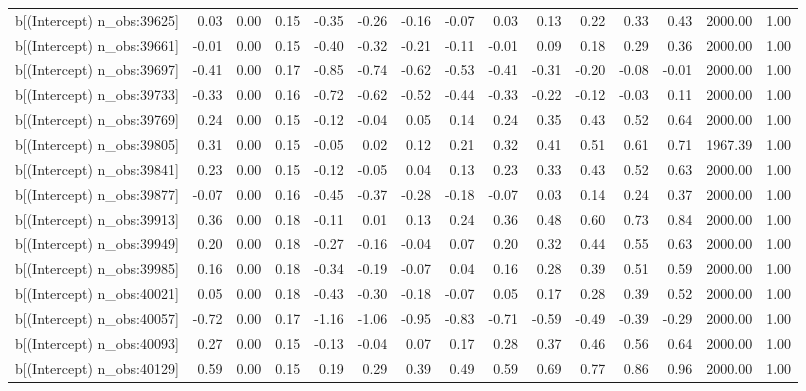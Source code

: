 \begin{table}[ht]
\begin{tabular}{rrrrrrrrrrrrrrr}
  b[(Intercept) n\_obs:39625] & 0.03 & 0.00 & 0.15 & -0.35 & -0.26 & -0.16 & -0.07 & 0.03 & 0.13 & 0.22 & 0.33 & 0.43 & 2000.00 & 1.00 \\ 
  b[(Intercept) n\_obs:39661] & -0.01 & 0.00 & 0.15 & -0.40 & -0.32 & -0.21 & -0.11 & -0.01 & 0.09 & 0.18 & 0.29 & 0.36 & 2000.00 & 1.00 \\ 
  b[(Intercept) n\_obs:39697] & -0.41 & 0.00 & 0.17 & -0.85 & -0.74 & -0.62 & -0.53 & -0.41 & -0.31 & -0.20 & -0.08 & -0.01 & 2000.00 & 1.00 \\ 
  b[(Intercept) n\_obs:39733] & -0.33 & 0.00 & 0.16 & -0.72 & -0.62 & -0.52 & -0.44 & -0.33 & -0.22 & -0.12 & -0.03 & 0.11 & 2000.00 & 1.00 \\ 
  b[(Intercept) n\_obs:39769] & 0.24 & 0.00 & 0.15 & -0.12 & -0.04 & 0.05 & 0.14 & 0.24 & 0.35 & 0.43 & 0.52 & 0.64 & 2000.00 & 1.00 \\ 
  b[(Intercept) n\_obs:39805] & 0.31 & 0.00 & 0.15 & -0.05 & 0.02 & 0.12 & 0.21 & 0.32 & 0.41 & 0.51 & 0.61 & 0.71 & 1967.39 & 1.00 \\ 
  b[(Intercept) n\_obs:39841] & 0.23 & 0.00 & 0.15 & -0.12 & -0.05 & 0.04 & 0.13 & 0.23 & 0.33 & 0.43 & 0.52 & 0.63 & 2000.00 & 1.00 \\ 
  b[(Intercept) n\_obs:39877] & -0.07 & 0.00 & 0.16 & -0.45 & -0.37 & -0.28 & -0.18 & -0.07 & 0.03 & 0.14 & 0.24 & 0.37 & 2000.00 & 1.00 \\ 
  b[(Intercept) n\_obs:39913] & 0.36 & 0.00 & 0.18 & -0.11 & 0.01 & 0.13 & 0.24 & 0.36 & 0.48 & 0.60 & 0.73 & 0.84 & 2000.00 & 1.00 \\ 
  b[(Intercept) n\_obs:39949] & 0.20 & 0.00 & 0.18 & -0.27 & -0.16 & -0.04 & 0.07 & 0.20 & 0.32 & 0.44 & 0.55 & 0.63 & 2000.00 & 1.00 \\ 
  b[(Intercept) n\_obs:39985] & 0.16 & 0.00 & 0.18 & -0.34 & -0.19 & -0.07 & 0.04 & 0.16 & 0.28 & 0.39 & 0.51 & 0.59 & 2000.00 & 1.00 \\ 
  b[(Intercept) n\_obs:40021] & 0.05 & 0.00 & 0.18 & -0.43 & -0.30 & -0.18 & -0.07 & 0.05 & 0.17 & 0.28 & 0.39 & 0.52 & 2000.00 & 1.00 \\ 
  b[(Intercept) n\_obs:40057] & -0.72 & 0.00 & 0.17 & -1.16 & -1.06 & -0.95 & -0.83 & -0.71 & -0.59 & -0.49 & -0.39 & -0.29 & 2000.00 & 1.00 \\ 
  b[(Intercept) n\_obs:40093] & 0.27 & 0.00 & 0.15 & -0.13 & -0.04 & 0.07 & 0.17 & 0.28 & 0.37 & 0.46 & 0.56 & 0.64 & 2000.00 & 1.00 \\ 
  b[(Intercept) n\_obs:40129] & 0.59 & 0.00 & 0.15 & 0.19 & 0.29 & 0.39 & 0.49 & 0.59 & 0.69 & 0.77 & 0.86 & 0.96 & 2000.00 & 1.00 \\ 

\end{tabular}
\end{table}
